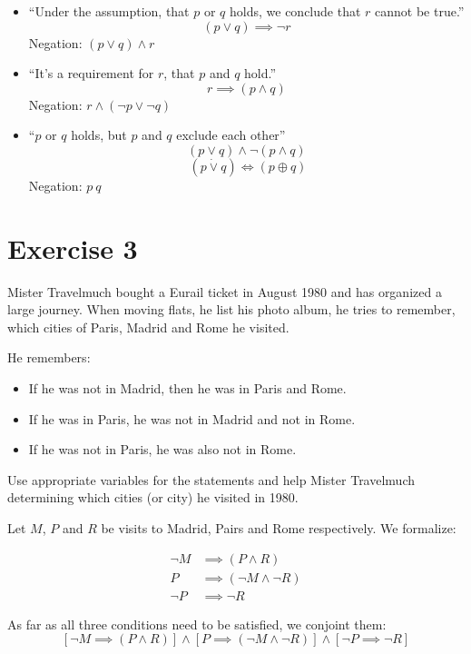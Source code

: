 \documentclass[a4paper]{article}
\theoremstyle{definition}
\begin{document}
\begin{itemize}
  \item \enquote{Under the assumption, that $p$ or $q$ holds, we conclude that $r$ cannot be true.}
    \[ (p \lor q) \implies \neg r \]
    Negation: $(p \lor q) \land r$
  \item \enquote{It's a requirement for $r$, that $p$ and $q$ hold.}
    \[ r \implies (p \land q) \]
    Negation: $r \land (\neg p \lor \neg q)$
  \item \enquote{$p$ or $q$ holds, but $p$ and $q$ exclude each other}
    \[ (p \lor q) \land \neg (p \land q) \]
    \[ \ (p \dot\lor q) \Longleftrightarrow (p \oplus q) \]
    Negation: $p \ q$
\end{itemize}

\section{Exercise 3}
\begin{ex}
  Mister Travelmuch bought a Eurail ticket in August 1980 and has organized a large journey.
  When moving flats, he list his photo album, he tries to remember,
  which cities of Paris, Madrid and Rome he visited.

  He remembers:
  \begin{itemize}
    \item If he was not in Madrid, then he was in Paris and Rome.
    \item If he was in Paris, he was not in Madrid and not in Rome.
    \item If he was not in Paris, he was also not in Rome.
  \end{itemize}

  Use appropriate variables for the statements and help Mister Travelmuch
  determining which cities (or city) he visited in 1980.
\end{ex}

Let $M$, $P$ and $R$ be visits to Madrid, Pairs and Rome respectively.
We formalize:

\begin{align*}
  \neg M &\implies (P \land R) \\
       P &\implies (\neg M \land \neg R) \\
  \neg P &\implies \neg R
\end{align*}

As far as all three conditions need to be satisfied, we conjoint them:
\[
    \left[\neg M \implies (P \land R)\right] \land
    \left[P \implies (\neg M \land \neg R)\right] \land
    \left[\neg P \implies \neg R\right]
\]
\end{document}
